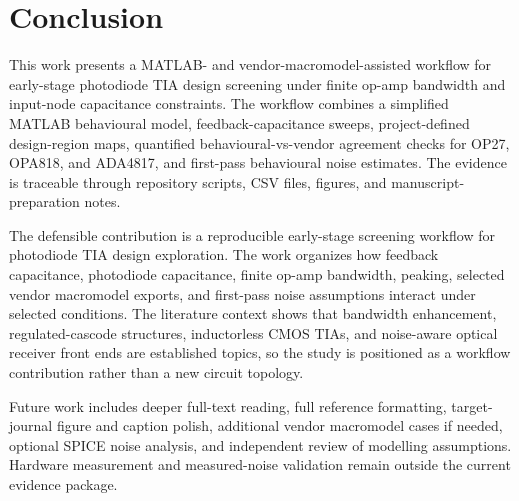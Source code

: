 \section{Conclusion}

This work presents a MATLAB- and vendor-macromodel-assisted workflow for early-stage photodiode TIA design screening under finite op-amp bandwidth and input-node capacitance constraints. The workflow combines a simplified MATLAB behavioural model, feedback-capacitance sweeps, project-defined design-region maps, quantified behavioural-vs-vendor agreement checks for OP27, OPA818, and ADA4817, and first-pass behavioural noise estimates. The evidence is traceable through repository scripts, CSV files, figures, and manuscript-preparation notes.

The defensible contribution is a reproducible early-stage screening workflow for photodiode TIA design exploration. The work organizes how feedback capacitance, photodiode capacitance, finite op-amp bandwidth, peaking, selected vendor macromodel exports, and first-pass noise assumptions interact under selected conditions. The literature context shows that bandwidth enhancement, regulated-cascode structures, inductorless CMOS TIAs, and noise-aware optical receiver front ends are established topics, so the study is positioned as a workflow contribution rather than a new circuit topology.

Future work includes deeper full-text reading, full reference formatting, target-journal figure and caption polish, additional vendor macromodel cases if needed, optional SPICE noise analysis, and independent review of modelling assumptions. Hardware measurement and measured-noise validation remain outside the current evidence package.
